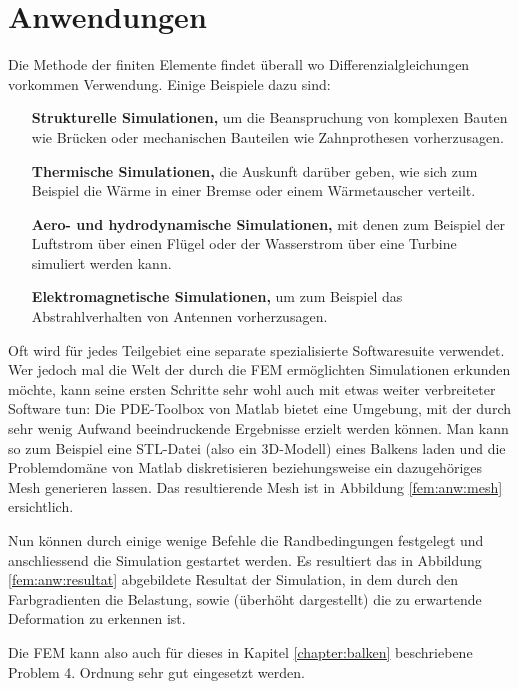%
%
%
%
\section{Anwendungen\label{fem:section:anwendungen}}

Die Methode der finiten Elemente findet überall wo Differenzialgleichungen vorkommen Verwendung.
Einige Beispiele dazu sind:
\begin{itemize}
    \item [\textbf{Strukturelle Simulationen,}] um die Beanspruchung von komplexen Bauten wie Brücken oder mechanischen Bauteilen wie Zahnprothesen vorherzusagen.
    \item [\textbf{Thermische Simulationen,}] die Auskunft darüber geben, wie sich zum Beispiel die Wärme in einer Bremse oder einem Wärmetauscher verteilt.
    \item [\textbf{Aero- und hydrodynamische Simulationen,}] mit denen zum Beispiel der Luftstrom über einen Flügel oder der Wasserstrom über eine Turbine simuliert werden kann.
    \item [\textbf{Elektromagnetische Simulationen,}] um zum Beispiel das Abstrahlverhalten von Antennen vorherzusagen.
\end{itemize}

Oft wird für jedes Teilgebiet eine separate spezialisierte Softwaresuite verwendet.
Wer jedoch mal die Welt der durch die FEM ermöglichten Simulationen erkunden möchte, kann seine ersten Schritte sehr wohl auch mit etwas weiter verbreiteter Software tun: 
Die PDE-Toolbox von Matlab bietet eine Umgebung, mit der durch sehr wenig Aufwand beeindruckende Ergebnisse erzielt werden können.
Man kann so zum Beispiel eine STL-Datei (also ein 3D-Modell) eines Balkens laden und die Problemdomäne von Matlab diskretisieren beziehungsweise ein dazugehöriges Mesh generieren lassen. 
Das resultierende Mesh ist in Abbildung \ref{fem:anw:mesh} ersichtlich.


Nun können durch einige wenige Befehle die Randbedingungen festgelegt und anschliessend die Simulation gestartet werden.
Es resultiert das in Abbildung \ref{fem:anw:resultat} abgebildete Resultat der Simulation, in dem durch den Farbgradienten die Belastung, sowie (überhöht dargestellt) die zu erwartende Deformation zu erkennen ist.


Die FEM kann also auch für dieses in Kapitel \ref{chapter:balken} beschriebene Problem 4. Ordnung sehr gut eingesetzt werden.